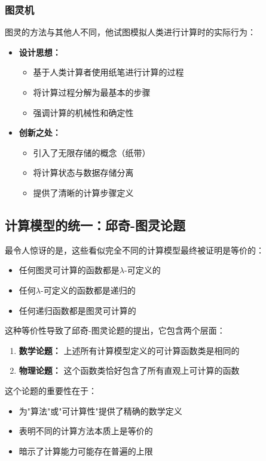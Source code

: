 \documentclass[a4paper,12pt]{ctexart}
\begin{document}
\subsubsection{图灵机}
图灵的方法与其他人不同，他试图模拟人类进行计算时的实际行为：
\begin{itemize}
    \item \textbf{设计思想：}
        \begin{itemize}
            \item 基于人类计算者使用纸笔进行计算的过程
            \item 将计算过程分解为最基本的步骤
            \item 强调计算的机械性和确定性
        \end{itemize}
    \item \textbf{创新之处：}
        \begin{itemize}
            \item 引入了无限存储的概念（纸带）
            \item 将计算状态与数据存储分离
            \item 提供了清晰的计算步骤定义
        \end{itemize}
\end{itemize}

\subsection{计算模型的统一：邱奇-图灵论题}
最令人惊讶的是，这些看似完全不同的计算模型最终被证明是等价的：
\begin{itemize}
    \item 任何图灵可计算的函数都是$\lambda$-可定义的
    \item 任何$\lambda$-可定义的函数都是递归的
    \item 任何递归函数都是图灵可计算的
\end{itemize}

这种等价性导致了邱奇-图灵论题的提出，它包含两个层面：
\begin{enumerate}
    \item \textbf{数学论题：} 上述所有计算模型定义的可计算函数类是相同的
    \item \textbf{物理论题：} 这个函数类恰好包含了所有直观上可计算的函数
\end{enumerate}

这个论题的重要性在于：
\begin{itemize}
    \item 为"算法"或"可计算性"提供了精确的数学定义
    \item 表明不同的计算方法本质上是等价的
    \item 暗示了计算能力可能存在普遍的上限
\end{itemize}
\end{document}
